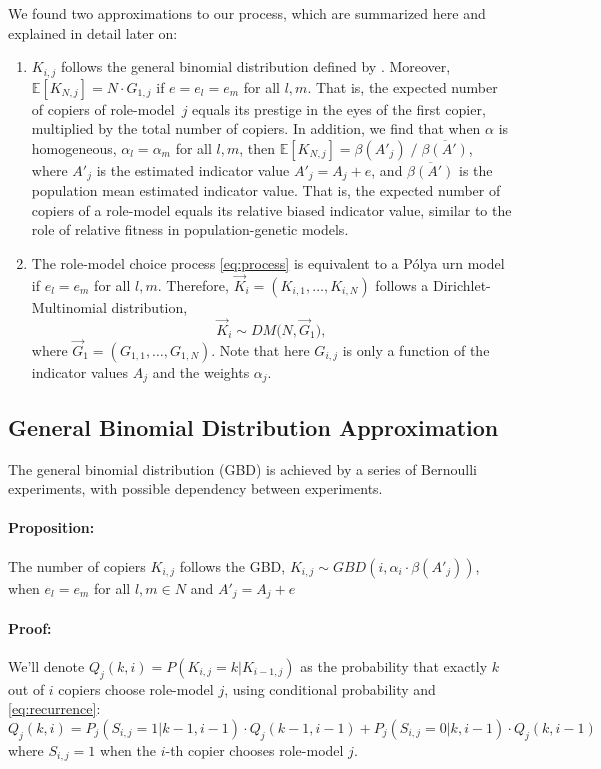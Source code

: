 \documentclass[11pt]{article}
\begin{document}
We found two approximations to our process, which are summarized here and explained in detail later on:
\begin{enumerate}
\item 
$K_{i,j}$ follows the general binomial distribution defined by \citet{GBD}.
Moreover, $\mathbb{E}[K_{N,j}] = N \cdot G_{1,j}$ if $e=e_l=e_m$ for all $l,m$.
 That is, the expected number of copiers of role-model~$j$ equals its prestige in the eyes of the first copier, multiplied by the total number of copiers. 
 In addition, we find that when $\alpha$ is homogeneous, $\alpha_l=\alpha_m$ for all $l,m$, then $\mathbb{E}[K_{N,j}] = \beta(A'_j) \; / \; \overline{\beta(A') }$, where $A'_j$ is the estimated indicator value $A'_j=A_j+e$, and 
 $\overline{ \beta(A') }$ is the population mean estimated indicator value. 
 That is, the expected number of copiers of a role-model equals its relative biased indicator value, similar to the role of relative fitness in population-genetic models.
\item The role-model choice process \cref{eq:process} is equivalent to a P\'{o}lya urn model if $e_l=e_m$ for all $l,m$. 
Therefore, $\vec{K}_i = (K_{i,1}, \ldots, K_{i,N})$ follows a Dirichlet-Multinomial distribution,
\begin{equation}
\vec{K}_i \sim \mathit{DM}\big(N, \vec{G}_1\big), 
\end{equation}
where $\vec{G}_1 = (G_{1,1}, \ldots, G_{1,N})$.
Note that here $G_{i,j}$ is only a function of the indicator values $A_j$ and the weights $\alpha_j$.
\end{enumerate}


\subsection{General Binomial Distribution Approximation}
The general binomial distribution (GBD) is achieved by a series of Bernoulli experiments, with possible dependency between experiments.
\paragraph{Proposition:} The number of copiers $K_{i,j}$ follows the GBD, $K_{i,j} \sim GBD(i,\alpha_i\cdot\beta(A'_j))$, when $e_l=e_m$ for all $l,m \in N$ and $A'_j=A_j + e$ 
\paragraph{Proof: } We'll denote $Q_j(k,i)=P(K_{i,j} = k | K_{i-1,j})$ as the probability that exactly $k$ out of $i$ copiers choose role-model $j$, using conditional probability and \cref{eq:recurrence}:
\begin{equation}\label{recursive}
Q_j(k,i) = P_j(S_{i,j}=1 | k-1,i-1) \cdot Q_j(k-1,i-1) + P_j(S_{i,j} =0 | k,i-1) \cdot Q_j(k,i-1)
\end{equation}
where $S_{i,j} =1 $ when the $i$-th copier chooses role-model $j$.
\end{document}
